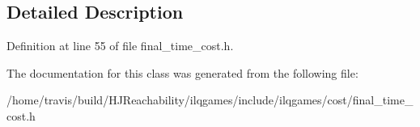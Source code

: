 \subsection{Detailed Description}


Definition at line 55 of file final\+\_\+time\+\_\+cost.\+h.



The documentation for this class was generated from the following file\+:\begin{DoxyCompactItemize}
\item 
/home/travis/build/\+H\+J\+Reachability/ilqgames/include/ilqgames/cost/final\+\_\+time\+\_\+cost.\+h\end{DoxyCompactItemize}
